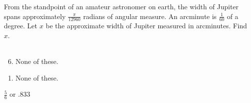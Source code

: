  
From the standpoint of an amateur astronomer on earth, the width of Jupiter spans approximately {\Large $\frac{\pi}{12960}$} radians of angular measure.  An arcminute is {\Large $\frac{1}{60}$} of a degree.  Let $x$ be the approximate width of Jupiter measured in arcminutes.  Find $x$. \\\\ 


\ifsat
	\begin{enumerate}[label=\Alph*)]
	\end{enumerate}
\else
\fi

\ifacteven
	\begin{enumerate}[label=\textbf{\Alph*.},itemsep=\fill,align=left]
		\setcounter{enumii}{5}
		\item None of these. 
	\end{enumerate}
\else
\fi

\ifactodd
	\begin{enumerate}[label=\textbf{\Alph*.},itemsep=\fill,align=left]
		\item None of these. 
	\end{enumerate}
\else
\fi

\ifgridin
$\frac{5}{6}$ or $.833$
\else
\fi

